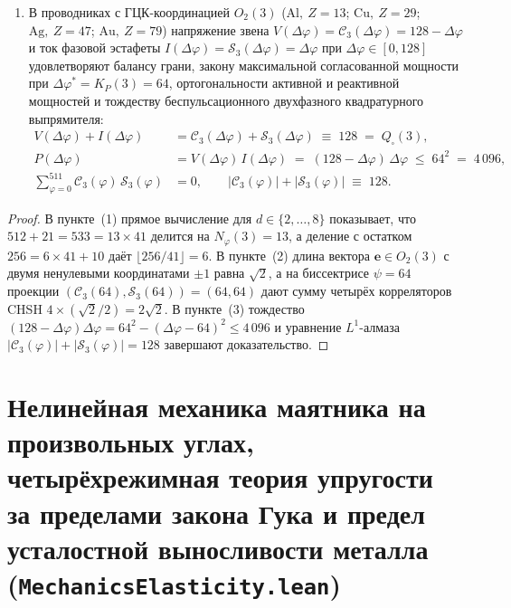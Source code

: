 \begin{theorem}[Порог дискретности $\Delta\varphi_{\mathrm{disc}}(3) = 41$, дискретные уравнения Максвелла, скорость связи $c_0 = \sqrt{2}\,c$, граница Цирельсона $2\sqrt{2}$ и законы теоретической электротехники]
\begin{enumerate}[label=\textbf{(\arabic*)},noitemsep]
\begin{align}
  \end{align}
\item В проводниках с ГЦК-координацией $O_2(3)$ ($\mathrm{Al},\ Z=13$; $\mathrm{Cu},\ Z=29$; $\mathrm{Ag},\ Z=47$; $\mathrm{Au},\ Z=79$) напряжение звена $V(\Delta\varphi) = \mathcal{C}_3(\Delta\varphi) = 128 - \Delta\varphi$ и ток фазовой эстафеты $I(\Delta\varphi) = \mathcal{S}_3(\Delta\varphi) = \Delta\varphi$ при $\Delta\varphi \in [0, 128]$ удовлетворяют балансу грани, закону максимальной согласованной мощности при $\Delta\varphi^* = K_P(3) = 64$, ортогональности активной и реактивной мощностей и тождеству беспульсационного двухфазного квадратурного выпрямителя:
  \begin{align}
    V(\Delta\varphi) + I(\Delta\varphi) &= \mathcal{C}_3(\Delta\varphi) + \mathcal{S}_3(\Delta\varphi) \;\equiv\; 128 \;=\; Q_\square(3), \label{eq:mono-ee-vi-balance} \\
    P(\Delta\varphi) &= V(\Delta\varphi)\,I(\Delta\varphi) \;=\; (128 - \Delta\varphi)\,\Delta\varphi \;\le\; 64^2 \;=\; 4\,096, \label{eq:mono-ee-max-power} \\
    \sum_{\varphi=0}^{511} \mathcal{C}_3(\varphi)\,\mathcal{S}_3(\varphi) &= 0, \qquad
    |\mathcal{C}_3(\varphi)| + |\mathcal{S}_3(\varphi)| \;\equiv\; 128. \label{eq:mono-ee-ortho-rectifier}
  \end{align}
\end{enumerate}
\end{theorem}

\begin{proof}
В пункте~(1) прямое вычисление для $d \in \{2,\dots,8\}$ показывает, что $512 + 21 = 533 = 13\times 41$ делится на $N_\varphi(3) = 13$, а деление с остатком $256 = 6\times 41 + 10$ даёт $\lfloor 256/41 \rfloor = 6$. В пункте~(2) длина вектора $\mathbf{e} \in O_2(3)$ с двумя ненулевыми координатами $\pm 1$ равна $\sqrt{2}$, а на биссектрисе $\psi = 64$ проекции $(\mathcal{C}_3(64), \mathcal{S}_3(64)) = (64, 64)$ дают сумму четырёх корреляторов CHSH $4\times (\sqrt{2}/2) = 2\sqrt{2}$. В пункте~(3) тождество $(128 - \Delta\varphi)\Delta\varphi = 64^2 - (\Delta\varphi - 64)^2 \le 4\,096$ и уравнение $L^1$-алмаза $|\mathcal{C}_3(\varphi)| + |\mathcal{S}_3(\varphi)| = 128$ завершают доказательство.
\end{proof}

\section{Нелинейная механика маятника на произвольных углах, четырёхрежимная теория упругости за пределами закона Гука и предел усталостной выносливости металла (\texttt{MechanicsElasticity.lean})}
\label{sec:mono-mechanics-elasticity-fatigue}

